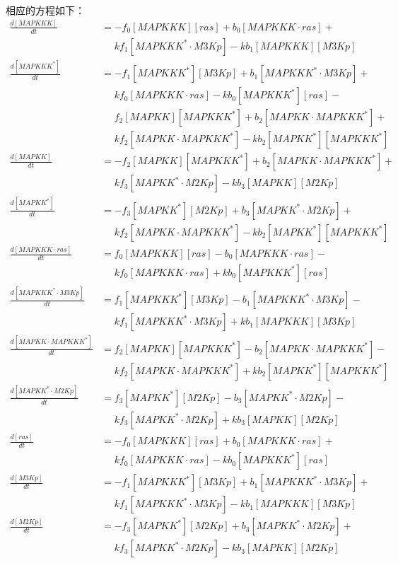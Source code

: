 相应的方程如下：
\small
\begin{equation*}
  \begin{align*}
    \frac{d[MAPKKK]}{dt} &= -f_{0}[MAPKKK][ras] + b_{0}[MAPKKK\cdot{}ras] +\\
    &\phantom{=} kf_{1}[MAPKKK^{*}\cdot{}M3Kp] - kb_{1}[MAPKKK][M3Kp]\\
    \frac{d[MAPKKK^{*}]}{dt} &= -f_{1}[MAPKKK^{*}][M3Kp] + b_{1}[MAPKKK^{*}\cdot{}M3Kp] +\\
    &\phantom{=} kf_{0}[MAPKKK\cdot{}ras] - kb_{0}[MAPKKK^{*}][ras] -\\
    &\phantom{=} f_{2}[MAPKK][MAPKKK^{*}] + b_{2}[MAPKK\cdot{}MAPKKK^{*}] +\\
    &\phantom{=} kf_{2}[MAPKK\cdot{}MAPKKK^{*}] - kb_{2}[MAPKK^{*}][MAPKKK^{*}]\\
    \frac{d[MAPKK]}{dt} &= -f_{2}[MAPKK][MAPKKK^{*}] + b_{2}[MAPKK\cdot{}MAPKKK^{*}] +\\
    &\phantom{=} kf_{3}[MAPKK^{*}\cdot{}M2Kp] - kb_{3}[MAPKK][M2Kp]\\
    \frac{d[MAPKK^{*}]}{dt} &= -f_{3}[MAPKK^{*}][M2Kp] + b_{3}[MAPKK^{*}\cdot{}M2Kp] +\\
    &\phantom{=} kf_{2}[MAPKK\cdot{}MAPKKK^{*}] - kb_{2}[MAPKK^{*}][MAPKKK^{*}]\\
    \frac{d[MAPKKK\cdot{}ras]}{dt} &= f_{0}[MAPKKK][ras] - b_{0}[MAPKKK\cdot{}ras] -\\
    &\phantom{=} kf_{0}[MAPKKK\cdot{}ras] + kb_{0}[MAPKKK^{*}][ras]\\
    \frac{d[MAPKKK^{*}\cdot{}M3Kp]}{dt} &= f_{1}[MAPKKK^{*}][M3Kp] - b_{1}[MAPKKK^{*}\cdot{}M3Kp] -\\
    &\phantom{=} kf_{1}[MAPKKK^{*}\cdot{}M3Kp] + kb_{1}[MAPKKK][M3Kp]\\
    \frac{d[MAPKK\cdot{}MAPKKK^{*}]}{dt} &= f_{2}[MAPKK][MAPKKK^{*}] - b_{2}[MAPKK\cdot{}MAPKKK^{*}] -\\
    &\phantom{=} kf_{2}[MAPKK\cdot{}MAPKKK^{*}] + kb_{2}[MAPKK^{*}][MAPKKK^{*}]\\
    \frac{d[MAPKK^{*}\cdot{}M2Kp]}{dt} &= f_{3}[MAPKK^{*}][M2Kp] - b_{3}[MAPKK^{*}\cdot{}M2Kp] -\\
    &\phantom{=} kf_{3}[MAPKK^{*}\cdot{}M2Kp] + kb_{3}[MAPKK][M2Kp]\\
    \frac{d[ras]}{dt} &= -f_{0}[MAPKKK][ras] + b_{0}[MAPKKK\cdot{}ras] +\\
    &\phantom{=} kf_{0}[MAPKKK\cdot{}ras] - kb_{0}[MAPKKK^{*}][ras]\\
    \frac{d[M3Kp]}{dt} &= -f_{1}[MAPKKK^{*}][M3Kp] + b_{1}[MAPKKK^{*}\cdot{}M3Kp] +\\
    &\phantom{=} kf_{1}[MAPKKK^{*}\cdot{}M3Kp] - kb_{1}[MAPKKK][M3Kp]\\
    \frac{d[M2Kp]}{dt} &= -f_{3}[MAPKK^{*}][M2Kp] + b_{3}[MAPKK^{*}\cdot{}M2Kp] +\\
    &\phantom{=} kf_{3}[MAPKK^{*}\cdot{}M2Kp] - kb_{3}[MAPKK][M2Kp]\\
  \end{align*}
\end{equation*}
\normalsize

